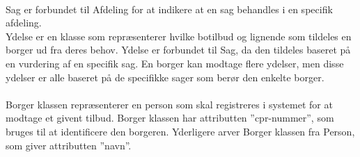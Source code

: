\\
Sag er forbundet til Afdeling for at indikere at en sag behandles i en specifik afdeling.\\
Ydelse er en klasse som repræsenterer hvilke botilbud og lignende som tildeles en borger ud fra deres behov. Ydelse er forbundet til Sag, da den tildeles baseret på en vurdering af en specifik sag. En borger kan modtage flere ydelser, men disse ydelser er alle baseret på de specifikke sager som berør den enkelte borger.\\ 
\\
Borger klassen repræsenterer en person som skal registreres i systemet for at modtage et givent tilbud. Borger klassen har attributten ”cpr-nummer”, som bruges til at identificere den borgeren. Yderligere arver Borger klassen fra Person, som giver attributten ”navn”.
